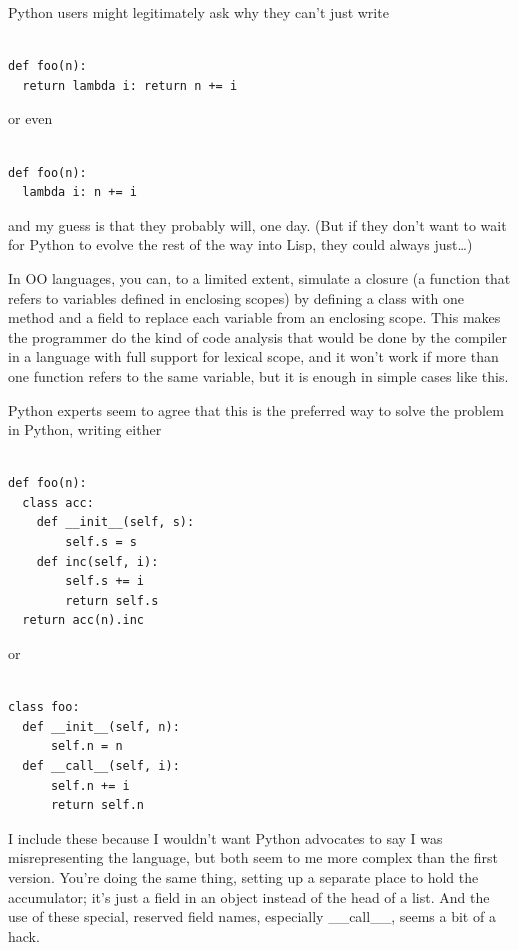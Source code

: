 Python users might legitimately ask why they can't just write

\begin{verbatim}

def foo(n):
  return lambda i: return n += i
\end{verbatim}

or even

\begin{verbatim}

def foo(n):
  lambda i: n += i
\end{verbatim}

and my guess is that they probably will, one day. (But if they don't
want to wait for Python to evolve the rest of the way into Lisp, they
could always just\ldots)

In OO languages, you can, to a limited extent, simulate a closure (a
function that refers to variables defined in enclosing scopes) by
defining a class with one method and a field to replace each variable
from an enclosing scope. This makes the programmer do the kind of code
analysis that would be done by the compiler in a language with full
support for lexical scope, and it won't work if more than one function
refers to the same variable, but it is enough in simple cases like this.

Python experts seem to agree that this is the preferred way to solve the
problem in Python, writing either

\begin{verbatim}

def foo(n):
  class acc:
    def __init__(self, s):
        self.s = s
    def inc(self, i):
        self.s += i
        return self.s
  return acc(n).inc
\end{verbatim}

or

\begin{verbatim}

class foo:
  def __init__(self, n):
      self.n = n
  def __call__(self, i):
      self.n += i
      return self.n
\end{verbatim}

I include these because I wouldn't want Python advocates to say I was
misrepresenting the language, but both seem to me more complex than the
first version. You're doing the same thing, setting up a separate place
to hold the accumulator; it's just a field in an object instead of the
head of a list. And the use of these special, reserved field names,
especially \_\_call\_\_, seems a bit of a hack.

